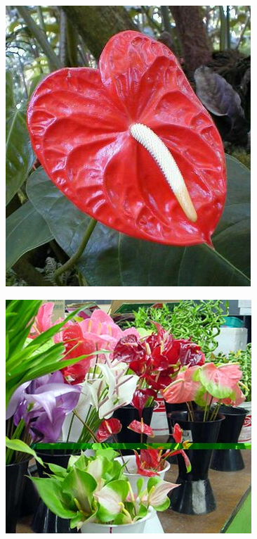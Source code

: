 \documentclass{article}
\begin{document}
\begin{center}
\includegraphics[height=0.9\textheight, angle=90]{../Anthurium2.jpg}
\end{center}
\newpage

\begin{center}
\includegraphics[height=0.9\textheight, angle=90]{../AnthuriumCF.jpg}
\end{center}
\newpage
\end{document}

